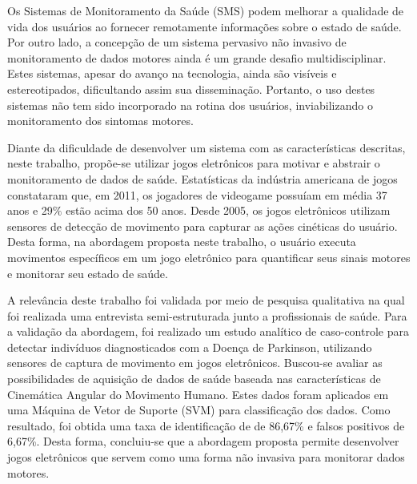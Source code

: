 
Os Sistemas de Monitoramento da Saúde (SMS) podem melhorar a qualidade de vida dos usuários ao fornecer remotamente informações sobre o estado de saúde. Por outro lado, a concepção de um sistema pervasivo não invasivo de monitoramento de dados motores ainda é um grande desafio multidisciplinar. Estes sistemas, apesar do avanço na tecnologia, ainda são visíveis e estereotipados, dificultando assim sua disseminação. Portanto, o uso destes sistemas não tem sido incorporado na rotina dos usuários, inviabilizando o monitoramento dos sintomas motores.
 
Diante da dificuldade de desenvolver um sistema com as características descritas, neste trabalho, propõe-se utilizar jogos eletrônicos para motivar e abstrair o monitoramento de dados de saúde. Estatísticas da indústria americana de jogos constataram que, em 2011, os jogadores de videogame possuíam em média 37 anos e 29$\%$  estão acima dos 50 anos. Desde 2005, os jogos eletrônicos utilizam sensores de detecção de movimento para capturar as ações cinéticas do usuário. Desta forma, na abordagem proposta neste trabalho, o usuário executa movimentos específicos em um jogo eletrônico para quantificar seus sinais motores e monitorar seu estado de saúde.

A relevância deste trabalho foi validada por meio de pesquisa qualitativa na qual foi realizada uma entrevista semi-estruturada junto a profissionais de saúde. Para a validação da abordagem, foi realizado um estudo analítico de caso-controle para detectar indivíduos diagnosticados com a Doença de Parkinson, utilizando sensores de captura de movimento em jogos eletrônicos. Buscou-se avaliar as possibilidades de aquisição de dados de saúde baseada nas características de Cinemática Angular do Movimento Humano. Estes dados foram aplicados em uma Máquina de Vetor de Suporte (SVM) para classificação dos dados. Como resultado, foi obtida uma taxa de identificação de  de 86,67\% e falsos positivos de 6,67\%. Desta forma, concluiu-se que a abordagem proposta permite desenvolver jogos eletrônicos que servem como uma forma não invasiva para monitorar dados motores.